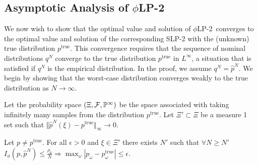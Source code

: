 \documentclass[ijoc,nonblindrev]{informs3} %
\renewcommand{\P}{\mathbb{P}}
\newcommand{\ptrue}{p^{\text{true}}}
\newcommand{\plp}{$\phi$LP-2}
\begin{document}

\subsection{Asymptotic Analysis of \plp}
\label{ssec:epiconvergence}

We now wish to show that the optimal value and solution of \plp\ converges to the optimal value and solution of the corresponding SLP-2 with the (unknown) true distribution $\ptrue$.
This convergence requires that the sequence of nominal distributions $q^N$ converge to the true distribution $\ptrue$ in $L^\infty$, a situation that is satisfied if $q^N$ is the empirical distribution.
In the proof, we assume $q^N = \hat{p}^N$.
We begin by showing that the worst-case distribution converges weakly to the true distribution as $N \rightarrow \infty$.

Let the probability space $(\Xi,{\cal F},\P^\infty)$ be the space associated with taking infinitely many samples from the distribution $\ptrue$.
Let $\Xi' \subset \Xi$ be a measure 1 set such that $\Vert \hat{p}^N(\xi) - \ptrue \Vert_\infty \rightarrow 0$.

\begin{proposition} \label{prop:weak_conv}
	Let $p \neq \ptrue$.
	For all $\epsilon > 0$ and $\xi \in \Xi'$ there exists $N'$ such that $\forall N \geq N'$ $I_{\phi}(p,\hat{p}^N) \leq \frac{\rho_0}{N} \Rightarrow \max_\omega |p_\omega - \ptrue_\omega| \leq \epsilon$.
\end{proposition}
\end{document}
